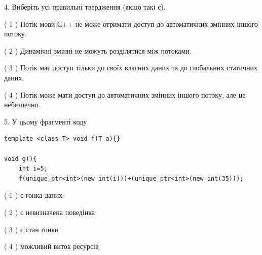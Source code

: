 \documentclass[12pt, ukrainian]{article}
\begin{document}
\begin {large}
{%
4. Виберіть усі правильні твердження (якщо такі є).\par
\vspace{2mm}

( 1 ) Потік мови С++ не може отримати доступ до автоматичних змінних іншого потоку.%

( 2 ) Динамічні змінні не можуть розділятися між потоками.%

( 3 ) Потік має доступ тільки до своїх власних даних та до глобальних статичних даних.%

( 4 ) Потік може мати доступ до автоматичних змінних іншого потоку, але це небезпечно.%


5. У цьому фрагменті коду
\begin{verbatim}
template <class T> void f(T a){}

void g(){
    int i=5;
    f(unique_ptr<int>(new int(i)))+(unique_ptr<int>(new int(35)));
\end{verbatim}
( 1 ) є гонка даних%

( 2 ) є невизначена поведінка%

( 3 ) є стан гонки%

( 4 ) можливий виток ресурсів%
}
\end {large}
\end{document}
